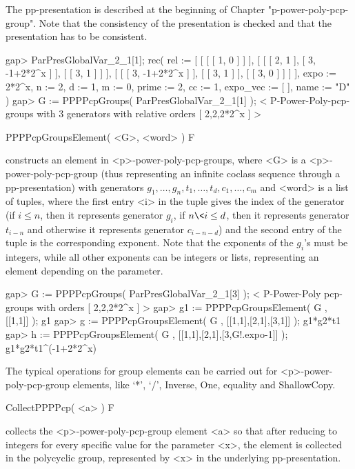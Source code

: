 The pp-presentation is described at the beginning of Chapter 
"p-power-poly-pcp-group". Note that the consistency of the presentation is 
checked and that the presentation has to be consistent.

\beginexample
gap> ParPresGlobalVar_2_1[1];
rec( 
  rel := [ [ [ [ 1, 0 ] ] ], [ [ [ 2, 1 ], [ 3, -1+2*2^x ] ], [ [ 3, 1 ] ] ], 
      [ [ [ 3, -1+2*2^x ] ], [ [ 3, 1 ] ], [ [ 3, 0 ] ] ] ], expo := 2*2^x, 
  n := 2, d := 1, m := 0, prime := 2, cc := 1, expo_vec := [  ], name := "D" )
gap> G := PPPPcpGroups( ParPresGlobalVar_2_1[1] );
< P-Power-Poly-pcp-groups with 3 generators with relative orders [ 2,2,2*2^x ] >
\endexample

\>PPPPcpGroupsElement( <G>, <word> ) F

constructs an element in <p>-power-poly-pcp-groups, where <G> is a 
<p>-power-poly-pcp-group (thus representing an infinite coclass sequence 
through a pp-presentation) with generators $g_1, \ldots, g_n, t_1, 
\ldots, t_d, c_1, \ldots, c_m$ and <word> is a list of tuples, where the first 
entry <i> in the tuple gives the index of the generator (if $i \le n$, then 
it represents generator $g_i$, if $n \< i \le d$, then it represents generator
$t_{i-n}$ and otherwise it represents generator $c_{i-n-d}$) and the second 
entry of the tuple is the corresponding exponent. Note that the exponents 
of the $g_i$'s must be integers, while all other exponents can be integers 
or lists, representing an element depending on the parameter.

\beginexample
gap> G := PPPPcpGroups( ParPresGlobalVar_2_1[3] );
< P-Power-Poly pcp-groups with orders [ 2,2,2*2^x ] >
gap> g1 := PPPPcpGroupsElement( G , [[1,1]] );
g1
gap> g := PPPPcpGroupsElement( G , [[1,1],[2,1],[3,1]] );
g1*g2*t1
gap> h := PPPPcpGroupsElement( G , [[1,1],[2,1],[3,G!.expo-1]] );
g1*g2*t1^(-1+2*2^x)
\endexample


The typical operations for group elements can be carried out for 
<p>-power-poly-pcp-group elements, like `*', `/', Inverse, One, equality and 
ShallowCopy.

\>CollectPPPPcp( <a> ) F

collects the <p>-power-poly-pcp-group element <a> so that after reducing to
integers for every specific value for the parameter <x>, the element is 
collected in the polycyclic group, represented by <x> in the underlying 
pp-presentation. 

